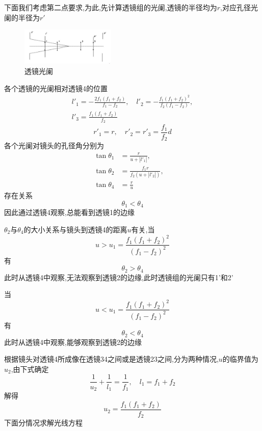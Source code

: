 \documentclass[UTF8]{gapd}
\begin{document}
下面我们考虑第二点要求,为此,先计算透镜组的光阑,透镜的半径均为$r$,对应孔径光阑的半径为$r'$
\begin{figure}[htbp]
  \centering
  \includegraphics[width=0.4\textwidth]{images/5.jpg}
  \caption{透镜光阑}
  \label{fig:5}
\end{figure}
各个透镜的光阑相对透镜4的位置
\begin{multline}
    l'_1=-\frac{2f_1(f_1+f_2)}{f_1-f_2} ,\quad l'_2=-\frac{f_1(f_1+f_2)^2}{f_2(f_1-f_2)} ,\\
    l'_3=\frac{f_1(f_1+f_2)}{f_2} 
\end{multline}
\begin{equation}
  r'_1=r,\quad r'_2=r'_3=\frac{f_1}{f_2}d 
\end{equation}
各个光阑对镜头的孔径角分别为
\begin{align}
  \tan\theta _1&=\frac{r}{u+|l'_1|} ,\quad \\
  \tan\theta _2&=\frac{f_1r}{f_2(u+|l'_2|)} ,\quad \\
  \tan\theta _4&=\frac{r}{u} 
\end{align}
存在关系
\begin{equation}
  \theta_1<\theta_4
\end{equation}
因此通过透镜4观察,总能看到透镜1的边缘

$\theta_2$与$\theta_4$的大小关系与镜头到透镜4的距离$u$有关,当
\begin{equation}
  u>u_1=\frac{f_1(f_1+f_2)^2}{(f_1-f_2)^2} 
\end{equation}
有
\begin{equation}
  \theta_2>\theta_4
\end{equation}
此时从透镜4中观察,无法观察到透镜2的边缘,此时透镜组的光阑只有1'和2'

当
\begin{equation}
  u<u_1=\frac{f_1(f_1+f_2)^2}{(f_1-f_2)^2} 
\end{equation}
有
\begin{equation}
  \theta_2<\theta_4
\end{equation}
此时从透镜4中观察,能够观察到透镜2的边缘

根据镜头对透镜4所成像在透镜34之间或是透镜23之间,分为两种情况,$u$的临界值为$u_2$,由下式确定
\begin{equation}
  \frac{1}{u_2}+\frac{1}{l_1}=\frac{1}{f_1},\quad l_1=f_1+f_2   
\end{equation}
解得
\begin{equation}
  u_2=\frac{f_1(f_1+f_2)}{f_2} 
\end{equation}
下面分情况求解光线方程
\end{document}
